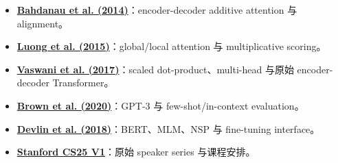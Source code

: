 \documentclass[a4paper]{article}
\begin{document}
{\small
\begin{itemize}[nosep,leftmargin=*]
  \item \href{https://arxiv.org/abs/1409.0473}{\textbf{Bahdanau et al. (2014)}}：encoder-decoder additive attention 与 alignment。
  \item \href{https://arxiv.org/abs/1508.04025}{\textbf{Luong et al. (2015)}}：global/local attention 与 multiplicative scoring。
  \item \href{https://arxiv.org/abs/1706.03762}{\textbf{Vaswani et al. (2017)}}：scaled dot-product、multi-head 与原始 encoder-decoder Transformer。
  \item \href{https://arxiv.org/abs/2005.14165}{\textbf{Brown et al. (2020)}}：GPT-3 与 few-shot/in-context evaluation。
  \item \href{https://arxiv.org/abs/1810.04805}{\textbf{Devlin et al. (2018)}}：BERT、MLM、NSP 与 fine-tuning interface。
  \item \href{https://web.stanford.edu/class/cs25/past/cs25-v1/}{\textbf{Stanford CS25 V1}}：原始 speaker series 与课程安排。
\end{itemize}
}
\end{document}
